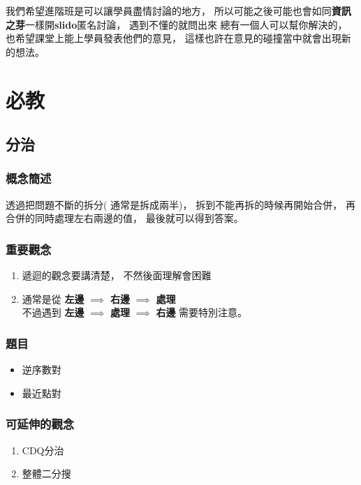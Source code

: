 \documentclass[12pt,oneside]{article}
\begin{document}
我們希望進階班是可以讓學員盡情討論的地方，
所以可能之後可能也會如同\textbf{資訊之芽}一樣開\textbf{slido}匿名討論，
遇到不懂的就問出來
總有一個人可以幫你解決的，
也希望課堂上能上學員發表他們的意見，
這樣也許在意見的碰撞當中就會出現新的想法。





\clearpage
\section{必教}

\subsection{分治}
\subsubsection*{概念簡述}
透過把問題不斷的拆分( 通常是拆成兩半)，
拆到不能再拆的時候再開始合併，
再合併的同時處理左右兩邊的值，
最後就可以得到答案。

\subsubsection*{重要觀念}
\begin{adjustwidth}{2em}{0em}
\begin{enumerate}
    \item 
        遞迴的觀念要講清楚，
        不然後面理解會困難
    \item 
        通常是從 \textbf{左邊} $\implies$ \textbf{右邊} $\implies$ \textbf{處理} \\
        不過遇到 \textbf{左邊} $\implies$ \textbf{處理} $\implies$ \textbf{右邊} 需要特別注意。

\end{enumerate}
\end{adjustwidth}

\subsubsection*{題目}
\begin{adjustwidth}{2em}{0em}
\begin{itemize}
    \item 逆序數對
    \item 最近點對
\end{itemize}
\end{adjustwidth}

\subsubsection*{可延伸的觀念}
\begin{adjustwidth}{2em}{0em}
\begin{enumerate}
    \item CDQ分治
    \item 整體二分搜
\end{enumerate}
\end{adjustwidth}
\end{document}
